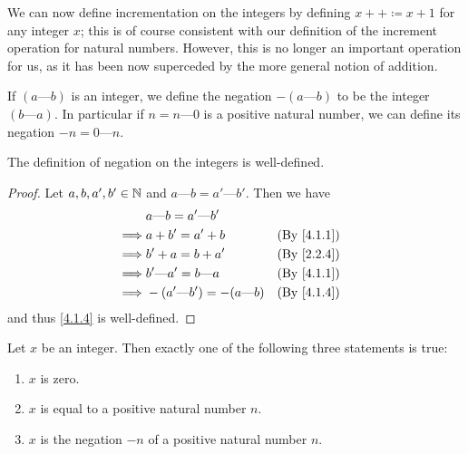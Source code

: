 \begin{note}
  We can now define incrementation on the integers by defining \(x++ \coloneqq x + 1\) for any integer \(x\);
  this is of course consistent with our definition of the increment operation for natural numbers.
  However, this is no longer an important operation for us, as it has been now superceded by the more general notion of addition.
\end{note}

\begin{defn}\label{4.1.4}
  If \((a \text{---} b)\) is an integer, we define the negation \(-(a \text{---} b)\) to be the integer \((b \text{---} a)\).
  In particular if \(n = n \text{---} 0\) is a positive natural number, we can define its negation \(-n = 0 \text{---} n\).
\end{defn}

\begin{ac}\label{ac:4.1.2}
  The definition of negation on the integers is well-defined.
\end{ac}

\begin{proof}
  Let \(a, b, a', b' \in \mathbb{N}\) and \(a \text{---} b = a' \text{---} b'\).
  Then we have
  \begin{align*}
             & a \text{---} b = a' \text{---} b'                                     \\
    \implies & a + b' = a' + b                         &  & \text{(By \cref{4.1.1})} \\
    \implies & b' + a = b + a'                         &  & \text{(By \cref{2.2.4})} \\
    \implies & b' \text{---} a' = b \text{---} a       &  & \text{(By \cref{4.1.1})} \\
    \implies & -(a' \text{---} b') = -(a \text{---} b) &  & \text{(By \cref{4.1.4})} \\
  \end{align*}
  and thus \cref{4.1.4} is well-defined.
\end{proof}

\begin{lem}\label{4.1.5}
  Let \(x\) be an integer.
  Then exactly one of the following three statements is true:
  \begin{enumerate}
    \item \(x\) is zero.
    \item \(x\) is equal to a positive natural number \(n\).
    \item \(x\) is the negation \(-n\) of a positive natural number \(n\).
  \end{enumerate}
\end{lem}


